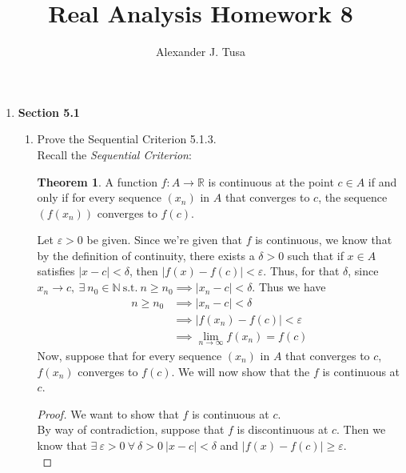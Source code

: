 \documentclass[12pt,letterpaper]{article}
\author{Alexander J. Tusa}
\title{Real Analysis Homework 8}
\newcommand{\st}{\ \text{s.t.}\ }
\newcommand{\R}{\mathbb{R}}
\newcommand{\N}{\mathbb{N}}
\theoremstyle{case}
\theoremstyle{definition}
\newtheorem*{theorem*}{Theorem}
\begin{document}
	\maketitle
	\begin{enumerate}
		\item \textbf{Section 5.1}
		\begin{enumerate}
			\item[1.] Prove the Sequential Criterion 5.1.3.\\
			
			Recall the \textit{Sequential Criterion}:
			\begin{theorem*}
				A function $f:A \to \R$ is continuous at the point $c \in A$ if and only if for every sequence $(x_n)$ in $A$ that converges to $c$, the sequence $(f(x_n))$ converges to $f(c)$.
			\end{theorem*}
			
			Let $\varepsilon > 0$ be given. Since we're given that $f$ is continuous, we know that by the definition of continuity, there exists a $\delta >0$ such that if $x \in A$ satisfies $|x-c|<\delta$, then $|f(x)-f(c)|<\varepsilon$. Thus, for that $\delta$, since $x_n \to c,\ \exists\ n_0 \in \N \st n \geq n_0 \implies |x_n-c|<\delta$. Thus we have
			\begin{align*}
				n \geq n_0 &\implies |x_n - c|<\delta \\
				&\implies |f(x_n)-f(c)|<\varepsilon \\
				&\implies \lim\limits_{n \to \infty} f(x_n)=f(c)
			\end{align*}
			Now, suppose that for every sequence $(x_n)$ in $A$ that converges to $c$, $f(x_n)$ converges to $f(c)$. We will now show that the $f$ is continuous at $c$.
			\begin{proof}
				We want to show that $f$ is continuous at $c$.\\
				
				By way of contradiction, suppose that $f$ is discontinuous at $c$. Then we know that $\exists\ \varepsilon >0\ \forall\ \delta > 0\ |x-c|<\delta$ and $|f(x)-f(c)| \geq \varepsilon$.\\
				

\end{proof}
\end{enumerate}
\end{enumerate}
\end{document}
